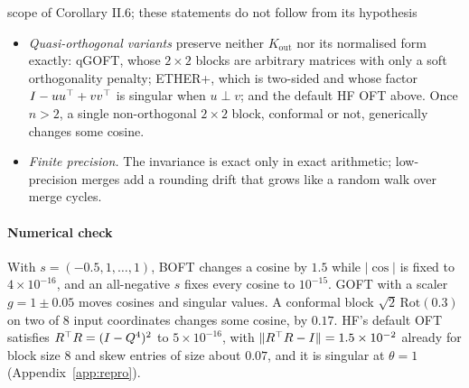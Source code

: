 \begin{remark*}{scope of Corollary II.6; these statements do not follow from its hypothesis}
\begin{itemize}
    where $\pm i\theta_k$ are the eigenvalues of $Q$: a systematic contraction for small $Q$, and $R$ is singular when
    some $\theta_k=1$. Already the adapted weight has $K_{\mathrm{out}}=W_0(I-Q^4)^2W_0\T$, a drift of order
    $\lVert Q\rVert^4$, and merge cycles compound it. For $\lVert Q\rVert_{\mathrm{op}}\le2^{1/4}$ every factor is a
    contraction, so the drift is a monotone shrinkage of neuron norms and singular values (,
    corollary 4). In 0.16 and 0.17 the last coefficient was $2$, so $R\T R=I+4Q^6+4Q^8$, still not orthogonal, with
    drift of order $\lVert Q\rVert^6$. (HF's docstring says the default is \texttt{False}; the dataclass default is
    \texttt{True}.)
  \item \emph{Quasi-orthogonal variants} preserve neither $K_{\mathrm{out}}$ nor its normalised form exactly: qGOFT,
    whose $2\times2$ blocks are arbitrary matrices with only a soft orthogonality penalty; ETHER+, which is two-sided and
    whose factor $I-uu^{\top}+vv^{\top}$ is singular when $u\perp v$; and the default HF OFT above. Once $n>2$, a single
    non-orthogonal $2\times2$ block, conformal or not, generically changes some cosine.
  \item \emph{Finite precision.} The invariance is exact only in exact arithmetic; low-precision merges add a rounding
    drift that grows like a random walk over merge cycles.
\end{itemize}
\end{remark*}

\paragraph{Numerical check}
With $s=(-0.5,1,\dots,1)$, BOFT changes a cosine by $1.5$ while $\lvert\cos\rvert$ is fixed to $4\times10^{-16}$, and an
all-negative $s$ fixes every cosine to $10^{-15}$. GOFT with a scaler $g=1\pm0.05$ moves cosines and singular values. A
conformal block $\sqrt2\,\mathrm{Rot}(0.3)$ on two of $8$ input coordinates changes some cosine, by $0.17$. HF's default
OFT satisfies $R^{\top} R=(I-Q^4)^2$ to $5\times10^{-16}$, with $\lVert R^{\top} R-I\rVert=1.5\times10^{-2}$ already for block
size $8$ and skew entries of size about $0.07$, and it is singular at $\theta=1$ (Appendix~\ref{app:repro}).

